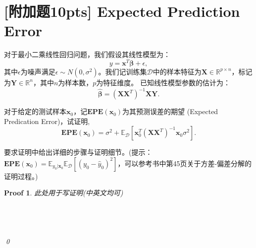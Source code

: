 \documentclass[a4paper,UTF8]{article}
\numberwithin{equation}{section}
\newtheorem*{myProof}{Proof}
\begin{document}
\newpage
\section{[附加题10pts] Expected Prediction Error}
对于最小二乘线性回归问题，我们假设其线性模型为：
\begin{equation}
	y=\textbf{x}^T  \bm{ \beta } + \epsilon , 
\end{equation}
其中$\epsilon$为噪声满足$\epsilon\sim N(0,\sigma^2)$。我们记训练集$\mathcal{D}$中的样本特征为$\textbf{X}\in \mathbb{R}^{p \times n}$，标记为$\textbf{Y}\in \mathbb{R}^{n}$，其中$n$为样本数，$p$为特征维度。
已知线性模型参数的估计为：
\begin{equation}
	\hat{\bm{\beta}}=(\textbf{X}\textbf{X}^T)^{-1}\textbf{X}\textbf{Y}.	
\end{equation}

对于给定的测试样本$\textbf{x}_0$，记$\mathbf{EPE}(\textbf{x}_0)$为其预测误差的期望 (Expected Predication Error)，试证明,
\[
	\mathbf{EPE}(\textbf{x}_0) = \sigma^2+\mathbb{E}_{\mathcal{D}}[\textbf{x}_0^T(\textbf{X}\textbf{X}^T)^{-1}\textbf{x}_0\sigma^2].
\]

要求证明中给出详细的步骤与证明细节。(提示：$\mathbf{EPE}(\textbf{x}_0)=\mathbb{E}_{y_0|\textbf{x}_0} \mathbb{E}_{\mathcal{D}}[(y_0-\hat{y}_0)^2]$，可以参考书中第45页关于方差-偏差分解的证明过程。)

\begin{myProof}
此处用于写证明(中英文均可)
~\\
~\\
~\\
~\\
~\\
\qed
\end{myProof}
\end{document}
